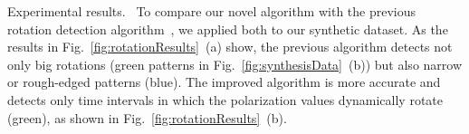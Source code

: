 \textsf{Experimental results.\ } To compare our novel algorithm with the previous rotation detection algorithm~\cite{Sawada2018}, we applied both to our synthetic dataset.
As the results in Fig.~\ref{fig:rotationResults}~(a) show, 
the previous algorithm detects not only big rotations (green patterns in Fig.~\ref{fig:synthesisData}~(b)) but also narrow or rough-edged patterns (blue).
The improved algorithm is more accurate and detects only time intervals in which the polarization values dynamically rotate (green), as shown in Fig.~\ref{fig:rotationResults}~(b).







